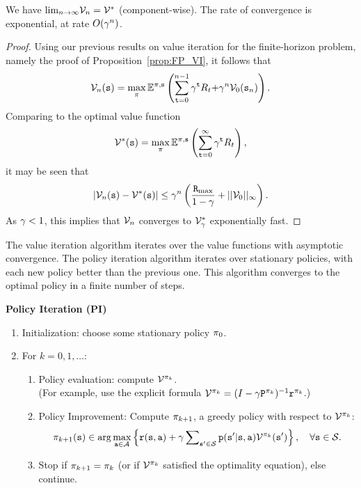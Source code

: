 \begin{theorem}\label{thm:_VI}
We have ${\lim _{n \to \infty }}{\mathcal{V}_n} = \mathcal{V}_{}^*$
(component-wise). The rate of convergence is exponential, at rate
$O({\gamma ^n})$.
\end{theorem}

\begin{proof}
Using our previous results on value iteration for the finite-horizon
problem, namely the proof of Proposition~\ref{prop:FP_VI}, it
follows that
\[{\mathcal{V}_n}({\tt s}) = \mathop {\max }\limits_\pi  {\ensuremath{\mathbb{E}}^{\pi,{\tt s}}}\left(\sum\limits_{{\tt t} = 0}^{n - 1} {{\gamma ^{\tt t}}{R_t} + } {\gamma ^n}{\mathcal{V}_0}({{\tt s}_n})\right).\]
Comparing to the optimal value function
\[{\mathcal{V}^*}({\tt s}) = \mathop {\max }\limits_\pi  {\ensuremath{\mathbb{E}}^{\pi,{\tt s}}}\left(\sum\limits_{{\tt t} = 0}^\infty  {{\gamma^{\tt t}}{R_t}} \right),\]
it may be seen that
\[|{\mathcal{V}_n}({\tt s}) - \mathcal{V}_{}^*({\tt s})| \le {\gamma^n}\left(\frac{{{\tt R}_{\max }}}{{1 - \gamma }} + ||{\mathcal{V}_0}|{|_\infty }\right).\]
As $\gamma  < 1$, this implies that ${\mathcal{V}_n}$ converges to
$\mathcal{V}_\gamma ^*$  exponentially fast.
\end{proof}

The value iteration algorithm iterates over the value functions with asymptotic convergence. The policy iteration algorithm iterates over stationary policies, with each new policy better than the previous one. This algorithm converges to the optimal policy in a finite number of steps.

\begin{algorithm_}\textbf{Policy Iteration (PI)}\label{alg:PI}
\begin{enumerate}
\item Initialization: choose some stationary policy ${\pi _0}$.
\item For $k = 0,1, \ldots $:
\begin{enumerate}
\item Policy evaluation: compute ${\mathcal{V}^{{\pi _k}}}$.\\
     (For example, use the explicit formula  ${\mathcal{V}^{{\pi _k}}} = {(I - \gamma {{\tt P}^{{\pi_k}}})^{ - 1}}{{\tt r}^{{\pi
     _k}}}$.)
\item Policy Improvement: Compute ${\pi _{k + 1}}$, a greedy policy with respect to ${\mathcal{V}^{{\pi _k}}}$:
\[{\pi _{k + 1}}({\tt s}) \in \arg {\max _{{\tt a}\in \mathcal{A}}}\left\{ {{\tt r}({\tt s},{\tt a}) + \gamma \sum\nolimits_{{\tt s}' \in \mathcal{S}} {{\tt p}({\tt s}'|{\tt s},{\tt a}){\mathcal{V}^{{\pi _k}}}({\tt s}')} } \right\},\quad \forall {\tt s} \in \mathcal{S}.\]
\item Stop if $\pi _{k + 1} = \pi _k$
(or if ${\mathcal{V}^{{\pi _k}}}$ satisfied the optimality equation), else
continue.
\end{enumerate}
\end{enumerate}
\end{algorithm_}

